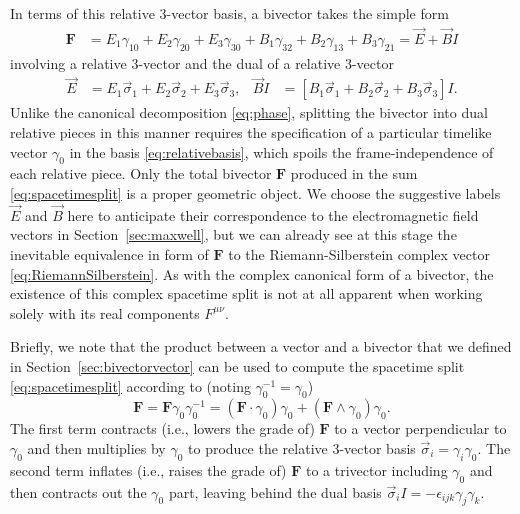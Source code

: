 \documentclass[1p,sort&compress]{elsarticle}
\numberwithin{equation}{section}
\newcommand{\rv}[1]{\vec{#1}}
\newcommand{\bv}[1]{\mathbf{#1}}
\begin{document}
In terms of this relative 3-vector basis, a bivector takes the simple form 
\begin{align}\label{eq:spacetimesplit}
  \bv{F} &= E_1 \gamma_{10} + E_2 \gamma_{20} + E_3 \gamma_{30} + B_1 \gamma_{32} + B_2 \gamma_{13} + B_3 \gamma_{21} = \rv{E} + \rv{B}I
\end{align}
involving a relative 3-vector and the dual of a relative 3-vector 
\begin{align}
  \rv{E} &= E_1 \rv{\sigma}_1 + E_2 \rv{\sigma}_2 + E_3 \rv{\sigma}_3, &
  \rv{B}I &= \left[B_1 \rv{\sigma}_1 + B_2 \rv{\sigma}_2 + B_3 \rv{\sigma}_3\right]I. 
\end{align}
Unlike the canonical decomposition \eqref{eq:phase}, splitting the bivector into dual relative pieces in this manner requires the specification of a particular timelike vector $\gamma_0$ in the basis \eqref{eq:relativebasis}, which spoils the frame-independence of each relative piece.  Only the total bivector $\bv{F}$ produced in the sum \eqref{eq:spacetimesplit} is a proper geometric object.  We choose the suggestive labels $\rv{E}$ and $\rv{B}$ here to anticipate their correspondence to the electromagnetic field vectors in Section~\ref{sec:maxwell}, but we can already see at this stage the inevitable equivalence in form of $\bv{F}$ to the Riemann-Silberstein complex vector \eqref{eq:RiemannSilberstein}.  As with the complex canonical form of a bivector, the existence of this complex spacetime split is not at all apparent when working solely with its real components $F^{\mu\nu}$.

Briefly, we note that the product between a vector and a bivector that we defined in Section~\ref{sec:bivectorvector} can be used to compute the spacetime split \eqref{eq:spacetimesplit} according to (noting $\gamma_0^{-1} = \gamma_0$)
\begin{equation}\label{eq:bivectorsplit}
  \bv{F} = \bv{F}\gamma_0\gamma_0^{-1} = (\bv{F}\cdot\gamma_0)\gamma_0 + (\bv{F}\wedge\gamma_0)\gamma_0.
\end{equation}
The first term contracts (i.e., lowers the grade of) $\bv{F}$ to a vector perpendicular to $\gamma_0$ and then multiplies by $\gamma_0$ to produce the relative 3-vector basis $\rv{\sigma}_i = \gamma_i\gamma_0$. The second term inflates (i.e., raises the grade of) $\bv{F}$ to a trivector including $\gamma_0$ and then contracts out the $\gamma_0$ part, leaving behind the dual basis $\rv{\sigma}_i I = -\epsilon_{ijk}\gamma_j\gamma_k$.  
\end{document}

